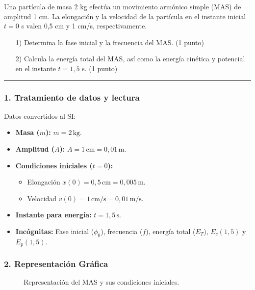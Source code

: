\begin{cajaenunciado}
Una partícula de masa 2 kg efectúa un movimiento armónico simple (MAS) de amplitud 1 cm. La elongación y la velocidad de la partícula en el instante inicial $t=0$ s valen 0,5 cm y 1 cm/s, respectivamente.
\begin{enumerate}
    \item[1)] Determina la fase inicial y la frecuencia del MAS. (1 punto)
    \item[2)] Calcula la energía total del MAS, así como la energía cinética y potencial en el instante $t=1,5$ s. (1 punto)
\end{enumerate}
\end{cajaenunciado}
\hrule

\subsubsection*{1. Tratamiento de datos y lectura}
Datos convertidos al SI:
\begin{itemize}
    \item \textbf{Masa ($m$):} $m=2\,\text{kg}$.
    \item \textbf{Amplitud ($A$):} $A=1\,\text{cm} = 0,01\,\text{m}$.
    \item \textbf{Condiciones iniciales ($t=0$):}
    \begin{itemize}
        \item Elongación $x(0) = 0,5\,\text{cm} = 0,005\,\text{m}$.
        \item Velocidad $v(0) = 1\,\text{cm/s} = 0,01\,\text{m/s}$.
    \end{itemize}
    \item \textbf{Instante para energía:} $t=1,5\,\text{s}$.
    \item \textbf{Incógnitas:} Fase inicial ($\phi_0$), frecuencia ($f$), energía total ($E_T$), $E_c(1,5)$ y $E_p(1,5)$.
\end{itemize}

\subsubsection*{2. Representación Gráfica}
\begin{figure}[H]
    \centering
    \caption{Representación del MAS y sus condiciones iniciales.}
\end{figure}

